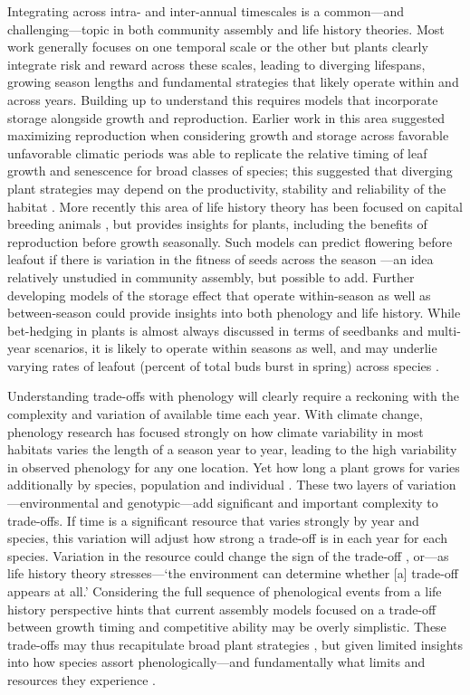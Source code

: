 \documentclass[11pt]{article}
\begin{document}
Integrating across intra- and inter-annual timescales is a common---and challenging---topic in both community assembly and life history theories. Most work generally focuses on one temporal scale or the other but plants clearly integrate risk and reward across these scales, leading to diverging lifespans, growing season lengths and fundamental strategies that likely operate within and across years. Building up to understand this requires models that incorporate storage alongside growth and reproduction. Earlier work in this area suggested maximizing reproduction when considering growth and storage across favorable unfavorable climatic periods was able to replicate the relative timing of leaf growth and senescence for broad classes of species; this suggested that diverging plant strategies may depend on the productivity, stability and reliability of the habitat \citep{iwasa1989optimal}. More recently this area of life history theory has been focused on capital breeding animals \citep[e.g.,][]{varpe2009adaptive}, but provides insights for plants, including the benefits of reproduction before growth seasonally. Such models can predict flowering before leafout if there is variation in the fitness of seeds across the season \citep{ejsmond2010time}---an idea relatively unstudied in community assembly, but possible to add. Further developing models of the storage effect that operate within-season as well as between-season could provide insights into both phenology and life history. While bet-hedging in plants is almost always discussed in terms of seedbanks and multi-year scenarios, it is likely to operate within seasons as well, and may underlie varying rates of leafout (percent of total buds burst in spring) across species \citep{baumgarten2021chilled}. 

Understanding trade-offs with phenology will clearly require a reckoning with the complexity and variation of available time each year. With climate change, phenology research has focused strongly on how climate variability in most habitats varies the length of a season year to year, leading to the high variability in observed phenology for any one location. Yet how long a plant grows for varies additionally by species, population and individual \citep{ettinger2018phenological,korner2023four}. These two layers of variation---environmental and genotypic---add significant and important complexity to trade-offs. If time is a significant resource that varies strongly by year and species, this variation will adjust how strong a trade-off is in each year for each species. Variation in the resource could change the sign of the trade-off \citep{van1986acquisition}, or---as life history theory stresses---`the environment can determine whether [a] trade-off appears at all.' Considering the full sequence of phenological events from a life history perspective hints that current assembly models focused on a trade-off between growth timing and competitive ability may be overly simplistic. These trade-offs may thus recapitulate broad plant strategies \citep{grime1977evidence}, but given limited insights into how species assort phenologically---and fundamentally what limits and resources they experience \citep{stanton2000}. 
\end{document}
